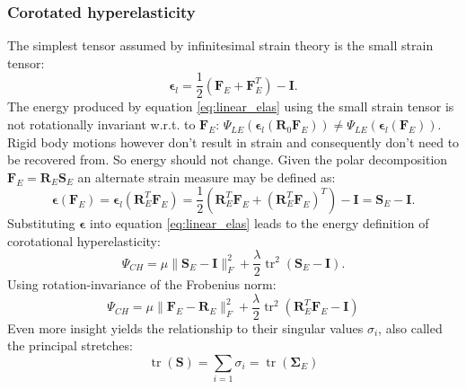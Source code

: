 \documentclass[m,times]{cgMA}
\begin{document}
\subsubsection{Corotated hyperelasticity}\label{sec:cor_hyper}
The simplest tensor assumed by infinitesimal strain theory is the small strain tensor: \begin{equation}
  \boldsymbol{\epsilon}_l = \frac { 1 } { 2 } \left( \boldsymbol { F }_E + \boldsymbol { F }_E ^ { T } \right) - \boldsymbol { I }.
\end{equation}
The energy produced by equation \ref{eq:linear_elas} using the small strain tensor is not rotationally invariant w.r.t. to $\boldsymbol{F}_E$: $\Psi_{LE}(\boldsymbol{\epsilon}_l(\boldsymbol{R}_{0} \boldsymbol{F}_E)) \neq \Psi_{LE}(\boldsymbol{\epsilon}_l(\boldsymbol{F}_E))$. Rigid body motions however don't result in strain and consequently don't need to be recovered from. So energy should not change. Given the polar decomposition $\boldsymbol{F}_E = \boldsymbol{R}_E\boldsymbol{S}_E$ an alternate strain measure may be defined as:
\begin{equation}
 \boldsymbol { \epsilon } \left( \boldsymbol { F }_E \right) = \boldsymbol { \epsilon }_l \left( \boldsymbol { R }_E ^ { T } \boldsymbol { F }_E \right) = \frac { 1 } { 2 } \left( \boldsymbol { R }_E ^ { T } \boldsymbol { F }_E + \left( \boldsymbol { R }_E ^ { T } \boldsymbol { F }_E \right) ^ { T } \right) - \boldsymbol { I } = \boldsymbol { S }_E - \boldsymbol { I }.
\end{equation}
Substituting $ {\boldsymbol{\epsilon}}$ into equation \ref{eq:linear_elas} leads to the energy definition of corotational hyperelasticity:
\begin{equation}\label{eq:corot_S}
  \Psi_{CH} = \mu \| \boldsymbol{ S }_E - \boldsymbol { I } \| _ { F } ^ { 2 } + \frac { \lambda } { 2 } \operatorname { tr } ^ { 2 } ( \boldsymbol { S }_E - \boldsymbol { I } ).
\end{equation}
Using rotation-invariance of the Frobenius norm:
\begin{equation}
  \Psi_{CH} = \mu \| \boldsymbol {F}_E  - \boldsymbol {R}_E \| _ { F } ^ { 2 } + \frac { \lambda } { 2 } \operatorname { tr } ^ { 2 } \left( \boldsymbol { R }_E ^ { T } \boldsymbol { F }_E - \boldsymbol { I } \right)
\end{equation}
Even more insight yields the relationship to their singular values $\sigma _ i$, also called the principal stretches:
$$\operatorname {tr}\left(\boldsymbol{S}\right) = \sum _ { i = 1 } \sigma _ { i } = \operatorname{tr}\left(\boldsymbol{\Sigma}_E\right)$$
\end{document}
